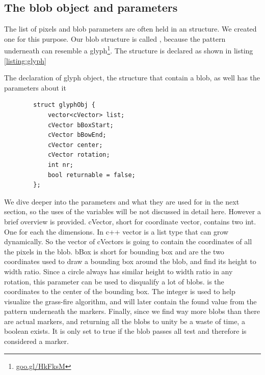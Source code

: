\subsection{The blob object and parameters}
The list of pixels and blob parameters are often held in an structure.
We created one for this purpose. Our blob structure is called , because the pattern underneath can resemble a glyph\footnote{\url{goo.gl/HkFksM}}. The structure is declared as shown in listing \ref{listing:glyph}
\begin{listing}[H]
	\caption{The declaration of glyph object, the structure that contain a blob, as well has the parameters about it}
	\begin{verbatim}
		struct glyphObj {
			vector<cVector> list;
			cVector bBoxStart;
			cVector bBowEnd;
			cVector center;
			cVector rotation;
			int nr;
			bool returnable = false;
		};
	\end{verbatim}
	\label{listing:glyph}
\end{listing}
We dive deeper into the parameters and what they are used for in the next section, so the uses of the variables will be not discussed in detail here. However a brief overview is provided. 
cVector, short for coordinate vector, contains two int. One for each the dimensions. In c++ vector is a list type that can grow dynamically. So the vector of cVectors is going to contain the coordinates of all the pixels in the blob. bBox is short for bounding box and are the two coordinates used to draw a bounding box around the blob, and find its height to width ratio. Since a circle always has similar height to width ratio in any rotation, this parameter can be used to disqualify a lot of blobs.  is the coordinates to the center of the bounding box.
The integer  is used to help visualize the grass-fire algorithm, and will later contain the found value from the pattern underneath the markers. Finally, since we find way more blobs than there are actual markers, and returning all the blobs to unity be a waste of time, a boolean  exists. It is only set to true if the blob passes all test and therefore is considered a marker.
